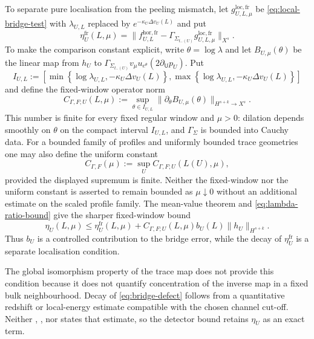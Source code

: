 \documentclass[11pt,a4paper]{article}
\theoremstyle{definition}
\theoremstyle{remark}
\begin{document}
	To separate pure localisation from the peeling mismatch, let
	$g^{\mathrm{loc,fr}}_{U,L,\mu}$ be \eqref{eq:local-bridge-test} with
	$\lambda_{U,L}$ replaced by
	$e^{-\kappa_U\Delta v_U(L)}$ and put
	\begin{equation}
		\eta_U^{\mathrm{fr}}(L,\mu)=
		\|f^{\mathrm{hor,fr}}_{U,L}
		-\Gamma_{\Sigma_{t_-(U)}}g^{\mathrm{loc,fr}}_{U,L,\mu}\|_{X^s}.
	\end{equation}
	To make the comparison constant explicit, write $\theta=\log\lambda$ and
	let $B_{U,\mu}(\theta)$ be the linear map from $h_U$ to
	$\Gamma_{\Sigma_{t_-(U)}}v_\mu u_{e^\theta}
	(2\partial_{\mathsf U}p_U)$.  Put
	\begin{equation}
		I_{U,L}:=
		\left[\min\!\left\{\log\lambda_{U,L},-\kappa_U\Delta v_U(L)\right\},
		\max\!\left\{\log\lambda_{U,L},-\kappa_U\Delta v_U(L)\right\}\right]
	\end{equation}
	and define the fixed-window operator norm
	\begin{equation}
		C_{\Gamma,F;U}(L,\mu):=
		\sup_{\theta\in I_{U,L}}
		\|\partial_\theta B_{U,\mu}(\theta)\|_{H^{s+k}\to X^s}.
		\label{eq:GammaF-constant}
	\end{equation}
	This number is finite for every fixed regular window and $\mu>0$: dilation
	depends smoothly on $\theta$ on the compact interval $I_{U,L}$, and
	$\Gamma_\Sigma$ is bounded into Cauchy data.  For a bounded family of
	profiles and uniformly bounded trace geometries one may also define the
	uniform constant
	\begin{equation}
		C_{\Gamma,F}(\mu):=
		\sup_U C_{\Gamma,F;U}(L(U),\mu),
	\end{equation}
	provided the displayed supremum is finite.  Neither the fixed-window nor the
	uniform constant is asserted to remain bounded as $\mu\downarrow0$ without
	an additional estimate on the scaled profile family.  The mean-value theorem
	and \eqref{eq:lambda-ratio-bound} give the sharper fixed-window bound
	\begin{equation}
		\eta_U(L,\mu)
		\leq \eta_U^{\mathrm{fr}}(L,\mu)
		+C_{\Gamma,F;U}(L,\mu)b_U(L)
		\|h_U\|_{H^{s+k}}.
		\label{eq:bridge-peeling-bound}
	\end{equation}
	Thus $b_U$ is a controlled contribution to the bridge error, while the decay
	of $\eta_U^{\mathrm{fr}}$ is a separate localisation condition.
	
	The global isomorphism property of the trace map does not provide this
	condition because it does not quantify concentration of the inverse map in a
	fixed bulk neighbourhood.  Decay of \eqref{eq:bridge-defect} follows from a
	quantitative redshift or local-energy estimate compatible with the chosen
	channel cut-off.  Neither \cite{Nicolas2016},
	\cite{BaskinWang2014}, nor \cite{KurpiczPinamontiVerch2021} states that
	estimate, so the detector bound retains $\eta_U$ as an exact term.
	
\end{document}
